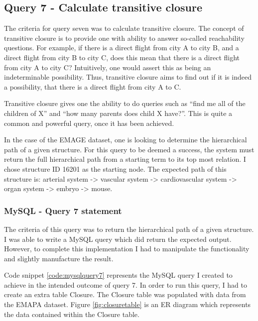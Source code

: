 \subsection*{Query 7 - Calculate transitive closure}\label{query7}
The criteria for query seven was to calculate transitive closure. The concept of transitive closure is to provide one with ability to answer so-called reachability questions. For example, if there is a direct flight from city A to city B, and a direct flight from city B to city C, does this mean that there is a direct flight from city A to city C? Intuitively, one would assert this as being an indeterminable possibility. Thus, transitive closure aims to find out if it is indeed a possibility, that there is a direct flight from city A to C.

Transitive closure gives one the ability to do queries such as ``find me all of the children of X'' and ``how many parents does child X have?''. This is quite a common and powerful query, once it has been achieved.

In the case of the EMAGE dataset, one is looking to determine the hierarchical path of a given structure. For this query to be deemed a success, the system must return the full hierarchical path from a starting term to its top most relation. I chose structure ID 16201 as the starting node. The expected path of this structure is: arterial system -> vascular system -> cardiovascular system -> organ system -> embryo -> mouse.

\subsubsection*{MySQL - Query 7 statement}\label{mysqlquery7statement}
The criteria of this query was to return the hierarchical path of a given structure. I was able to write a MySQL query which did return the expected output. However, to complete this implementation I had to manipulate the functionality and slightly manufacture the result.

Code snippet \ref{code:mysqlquery7} represents the MySQL query I created to achieve in the intended outcome of query 7. In order to run this query, I had to create an extra table Closure. The Closure table was populated with data from the EMAPA dataset. Figure \ref{fig:closuretable} is an ER diagram which represents the data contained within the Closure table.

